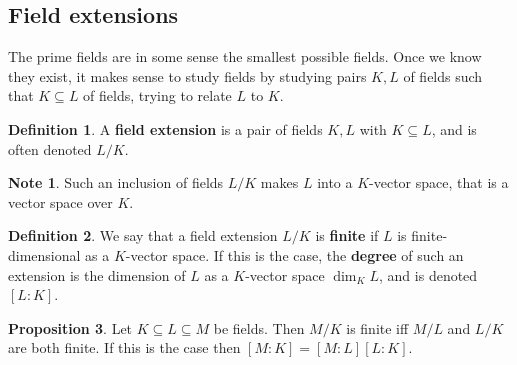 \documentclass{article}
\renewcommand{\sb}[1]{\left[ #1 \right]}
\theoremstyle{definition}\newtheorem{definition}{Definition}[subsection]
\theoremstyle{definition}\newtheorem{remark}[definition]{Remark}
\theoremstyle{definition}\newtheorem*{example}{Example}
\theoremstyle{definition}\newtheorem*{note}{Note}
\newtheorem{proposition}[definition]{Proposition}
\begin{document}
\subsection{Field extensions}

The prime fields are in some sense the smallest possible fields. Once we know they exist, it makes sense to study fields by studying pairs $ K, L $ of fields such that $ K \subseteq L $ of fields, trying to relate $ L $ to $ K $.

\begin{definition}
A \textbf{field extension} is a pair of fields $ K, L $ with $ K \subseteq L $, and is often denoted $ L / K $.
\end{definition}

\begin{note}
Such an inclusion of fields $ L / K $ makes $ L $ into a $ K $-vector space, that is a vector space over $ K $.
\end{note}

\begin{definition}
We say that a field extension $ L / K $ is \textbf{finite} if $ L $ is finite-dimensional as a $ K $-vector space. If this is the case, the \textbf{degree} of such an extension is the dimension of $ L $ as a $ K $-vector space $ \dim_KL $, and is denoted $ \sb{L : K} $.
\end{definition}

\begin{proposition}
Let $ K \subseteq L \subseteq M $ be fields. Then $ M / K $ is finite iff $ M / L $ and $ L / K $ are both finite. If this is the case then $ \sb{M : K} = \sb{M : L}\sb{L : K} $.
\end{proposition}
\end{document}
